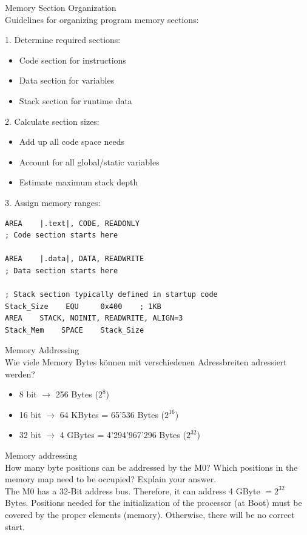 \begin{KR}{Memory Section Organization}\\
Guidelines for organizing program memory sections:

1. Determine required sections:
\begin{itemize}
  \item Code section for instructions
  \item Data section for variables
  \item Stack section for runtime data
\end{itemize}

2. Calculate section sizes:
\begin{itemize}
  \item Add up all code space needs
  \item Account for all global/static variables
  \item Estimate maximum stack depth
\end{itemize}

3. Assign memory ranges:
\begin{lstlisting}[language=armasm, style=basesmol]
AREA    |.text|, CODE, READONLY
; Code section starts here

AREA    |.data|, DATA, READWRITE
; Data section starts here

; Stack section typically defined in startup code
Stack_Size    EQU     0x400    ; 1KB
AREA    STACK, NOINIT, READWRITE, ALIGN=3
Stack_Mem    SPACE    Stack_Size
\end{lstlisting}
\end{KR}




\begin{example2}{Memory Addressing}\\
Wie viele Memory Bytes können mit verschiedenen Adressbreiten adressiert werden?
\begin{itemize}
  \item 8 bit $\rightarrow$ 256 Bytes ($2^8$)
  \item 16 bit $\rightarrow$ 64 KBytes = 65'536 Bytes ($2^{16}$)
  \item 32 bit $\rightarrow$ 4 GBytes = 4'294'967'296 Bytes ($2^{32}$)
\end{itemize}
\end{example2}



\begin{example2}{Memory addressing}\\
How many byte positions can be addressed by the M0? Which positions in the memory map need to be occupied? Explain your answer.
\vspace{2mm}\\
The M0 has a 32-Bit address bus. Therefore, it can address 4 GByte $=2^{32}$ Bytes. Positions needed for the initialization of the processor (at Boot) must be covered by the proper elements (memory). Otherwise, there will be no correct start.\\
\end{example2}

